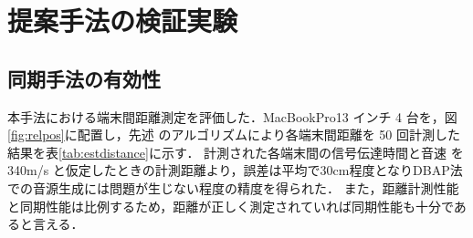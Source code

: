 \chapter{提案手法の検証実験}

\section{同期手法の有効性}

本手法における端末間距離測定を評価した．MacBookPro13 インチ 4 台を，図\ref{fig:relpos}に配置し，先述 のアルゴリズムにより各端末間距離を 50 回計測した結果を表\ref{tab:estdistance}に示す．
計測された各端末間の信号伝達時間と音速 を 340m/s と仮定したときの計測距離より，誤差は平均で30cm程度となりDBAP法での音源生成には問題が生じない程度の精度を得られた．
また，距離計測性能と同期性能は比例するため，距離が正しく測定されていれば同期性能も十分であると言える．


